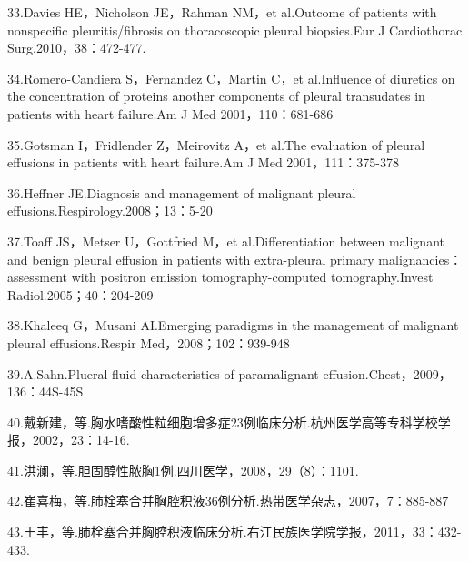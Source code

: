 33.Davies HE，Nicholson JE，Rahman NM，et al.Outcome of patients with
nonspecific pleuritis/fibrosis on thoracoscopic pleural biopsies.Eur J
Cardiothorac Surg.2010，38：472-477.

34.Romero-Candiera S，Fernandez C，Martin C，et al.Influence of
diuretics on the concentration of proteins another components of pleural
transudates in patients with heart failure.Am J Med 2001，110：681-686

35.Gotsman I，Fridlender Z，Meirovitz A，et al.The evaluation of pleural
effusions in patients with heart failure.Am J Med 2001，111：375-378

36.Heffner JE.Diagnosis and management of malignant pleural
effusions.Respirology.2008；13：5-20

37.Toaff JS，Metser U，Gottfried M，et al.Differentiation between
malignant and benign pleural effusion in patients with extra-pleural
primary malignancies：assessment with positron emission
tomography-computed tomography.Invest Radiol.2005；40：204-209

38.Khaleeq G，Musani AI.Emerging paradigms in the management of
malignant pleural effusions.Respir Med，2008；102：939-948

39.A.Sahn.Plueral fluid characteristics of paramalignant
effusion.Chest，2009，136：44S-45S

40.戴新建，等.胸水嗜酸性粒细胞增多症23例临床分析.杭州医学高等专科学校学报，2002，23：14-16.

41.洪澜，等.胆固醇性脓胸1例.四川医学，2008，29（8）：1101.

42.崔喜梅，等.肺栓塞合并胸腔积液36例分析.热带医学杂志，2007，7：885-887

43.王丰，等.肺栓塞合并胸腔积液临床分析.右江民族医学院学报，2011，33：432-433.

\protect\hypertarget{text00079.html}{}{}

